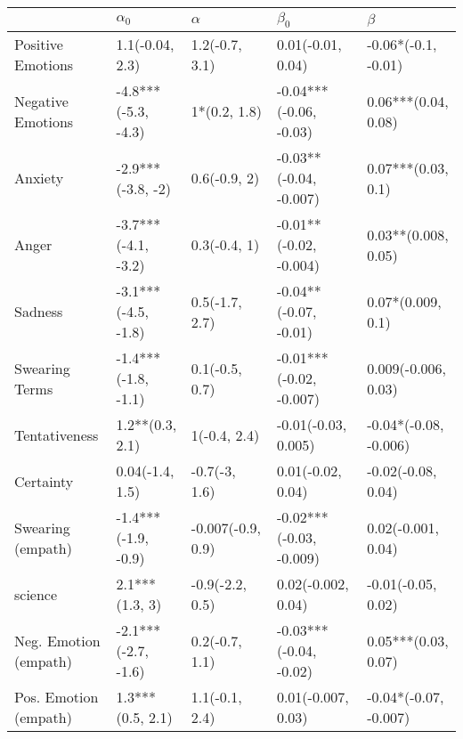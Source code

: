 \begin{tabular}{lllll}
\toprule
{} &           $\alpha_0$ &           $\alpha$ &                $\beta_0$ &                $\beta$ \\
\midrule
Positive Emotions     &      1.1(-0.04, 2.3) &     1.2(-0.7, 3.1) &        0.01(-0.01, 0.04) &    -0.06*(-0.1, -0.01) \\
Negative Emotions     &  -4.8***(-5.3, -4.3) &       1*(0.2, 1.8) &   -0.04***(-0.06, -0.03) &    0.06***(0.04, 0.08) \\
Anxiety               &    -2.9***(-3.8, -2) &       0.6(-0.9, 2) &   -0.03**(-0.04, -0.007) &     0.07***(0.03, 0.1) \\
Anger                 &  -3.7***(-4.1, -3.2) &       0.3(-0.4, 1) &   -0.01**(-0.02, -0.004) &    0.03**(0.008, 0.05) \\
Sadness               &  -3.1***(-4.5, -1.8) &     0.5(-1.7, 2.7) &    -0.04**(-0.07, -0.01) &      0.07*(0.009, 0.1) \\
Swearing Terms        &  -1.4***(-1.8, -1.1) &     0.1(-0.5, 0.7) &  -0.01***(-0.02, -0.007) &    0.009(-0.006, 0.03) \\
Tentativeness         &      1.2**(0.3, 2.1) &       1(-0.4, 2.4) &      -0.01(-0.03, 0.005) &  -0.04*(-0.08, -0.006) \\
Certainty             &      0.04(-1.4, 1.5) &      -0.7(-3, 1.6) &        0.01(-0.02, 0.04) &     -0.02(-0.08, 0.04) \\
Swearing (empath)     &  -1.4***(-1.9, -0.9) &  -0.007(-0.9, 0.9) &  -0.02***(-0.03, -0.009) &     0.02(-0.001, 0.04) \\
science               &       2.1***(1.3, 3) &    -0.9(-2.2, 0.5) &       0.02(-0.002, 0.04) &     -0.01(-0.05, 0.02) \\
Neg. Emotion (empath) &  -2.1***(-2.7, -1.6) &     0.2(-0.7, 1.1) &   -0.03***(-0.04, -0.02) &    0.05***(0.03, 0.07) \\
Pos. Emotion (empath) &     1.3***(0.5, 2.1) &     1.1(-0.1, 2.4) &       0.01(-0.007, 0.03) &  -0.04*(-0.07, -0.007) \\
\bottomrule
\end{tabular}
